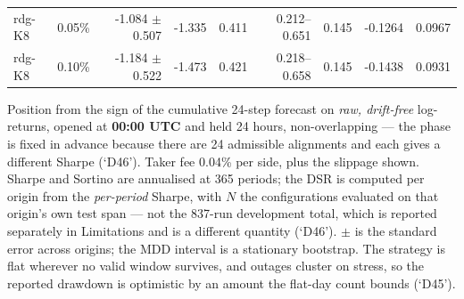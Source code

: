 \begin{table}[!t]
\begin{tabular}{llrrrrrrr}
rdg-K8 & 0.05\% & -1.084 $\pm$ 0.507 & -1.335 & 0.411 & 0.212--0.651 & 0.145 & -0.1264 & 0.0967 \\
rdg-K8 & 0.10\% & -1.184 $\pm$ 0.522 & -1.473 & 0.421 & 0.218--0.658 & 0.145 & -0.1438 & 0.0931 \\
\bottomrule
\end{tabular}
\vspace{2pt}\par\footnotesize Position from the sign of the cumulative 24-step forecast on \emph{raw, drift-free} log-returns, opened at \textbf{00:00 UTC} and held 24 hours, non-overlapping --- the phase is fixed in advance because there are 24 admissible alignments and each gives a different Sharpe (`D46'). Taker fee 0.04\% per side, plus the slippage shown. Sharpe and Sortino are annualised at 365 periods; the DSR is computed per origin from the \emph{per-period} Sharpe, with $N$ the configurations evaluated on that origin's own test span --- not the 837-run development total, which is reported separately in Limitations and is a different quantity (`D46'). $\pm$ is the standard error across origins; the MDD interval is a stationary bootstrap. The strategy is flat wherever no valid window survives, and outages cluster on stress, so the reported drawdown is optimistic by an amount the flat-day count bounds (`D45').
\end{table}
